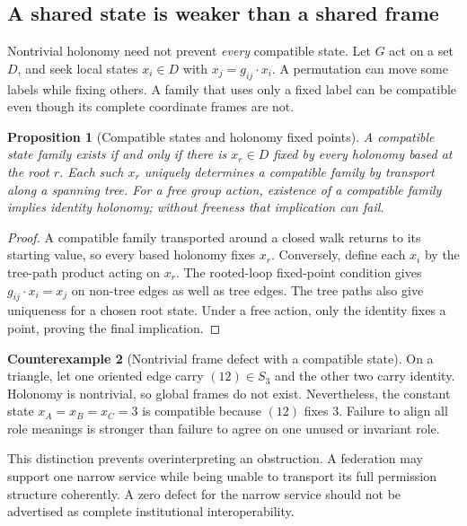 \documentclass[11pt,letterpaper]{article}
\theoremstyle{plain}
\newtheorem{proposition}{Proposition}[section]
\theoremstyle{definition}
\newtheorem{counterexample}[proposition]{Counterexample}
\theoremstyle{remark}
\begin{document}
\subsection{A shared state is weaker than a shared frame}
Nontrivial holonomy need not prevent \emph{every} compatible state. Let $G$ act on a set $D$, and seek local states $x_i\in D$ with $x_j=g_{ij}\cdot x_i$. A permutation can move some labels while fixing others. A family that uses only a fixed label can be compatible even though its complete coordinate frames are not.

\begin{proposition}[Compatible states and holonomy fixed points]\label{prop:holonomysection}
A compatible state family exists if and only if there is $x_r\in D$ fixed by every holonomy based at the root $r$. Each such $x_r$ uniquely determines a compatible family by transport along a spanning tree. For a free group action, existence of a compatible family implies identity holonomy; without freeness that implication can fail.
\end{proposition}
\begin{proof}
A compatible family transported around a closed walk returns to its starting value, so every based holonomy fixes $x_r$. Conversely, define each $x_i$ by the tree-path product acting on $x_r$. The rooted-loop fixed-point condition gives $g_{ij}\cdot x_i=x_j$ on non-tree edges as well as tree edges. The tree paths also give uniqueness for a chosen root state. Under a free action, only the identity fixes a point, proving the final implication.
\end{proof}

\begin{counterexample}[Nontrivial frame defect with a compatible state]\label{ex:fixedholonomy}
On a triangle, let one oriented edge carry $(12)\in S_3$ and the other two carry identity. Holonomy is nontrivial, so global frames do not exist. Nevertheless, the constant state $x_A=x_B=x_C=3$ is compatible because $(12)$ fixes $3$. Failure to align all role meanings is stronger than failure to agree on one unused or invariant role.
\end{counterexample}

This distinction prevents overinterpreting an obstruction. A federation may support one narrow service while being unable to transport its full permission structure coherently. A zero defect for the narrow service should not be advertised as complete institutional interoperability.
\end{document}

